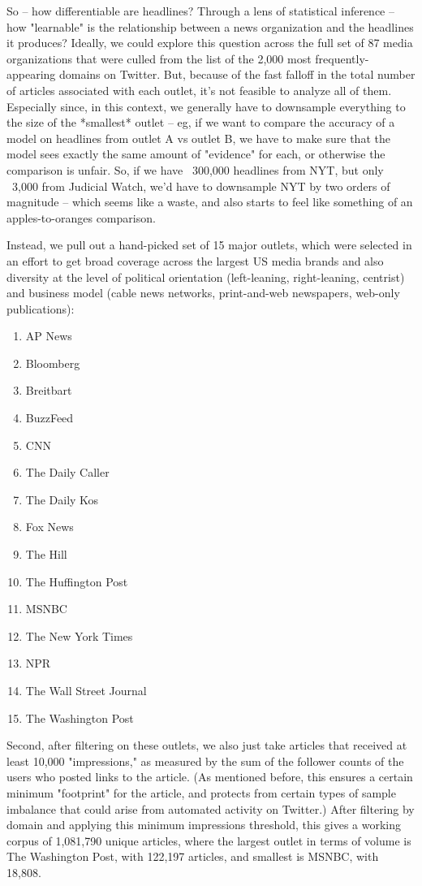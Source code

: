 \documentclass{scrartcl}
\begin{document}
So -- how differentiable are headlines? Through a lens of statistical inference -- how "learnable" is the relationship between a news organization and the headlines it produces? Ideally, we could explore this question across the full set of 87 media organizations that were culled from the list of the 2,000 most frequently-appearing domains on Twitter. But, because of the fast falloff in the total number of articles associated with each outlet, it's not feasible to analyze all of them. Especially since, in this context, we generally have to downsample everything to the size of the *smallest* outlet -- eg, if we want to compare the accuracy of a model on headlines from outlet A vs outlet B, we have to make sure that the model sees exactly the same amount of "evidence" for each, or otherwise the comparison is unfair. So, if we have ~300,000 headlines from NYT, but only ~3,000 from Judicial Watch, we'd have to downsample NYT by two orders of magnitude -- which seems like a waste, and also starts to feel like something of an apples-to-oranges comparison.

Instead, we pull out a hand-picked set of 15 major outlets, which were selected in an effort to get broad coverage across the largest US media brands and also diversity at the level of political orientation (left-leaning, right-leaning, centrist) and business model (cable news networks, print-and-web newspapers, web-only publications):

\begin{enumerate}
  \item AP News
  \item Bloomberg
  \item Breitbart
  \item BuzzFeed
  \item CNN
  \item The Daily Caller
  \item The Daily Kos
  \item Fox News
  \item The Hill
  \item The Huffington Post
  \item MSNBC
  \item The New York Times
  \item NPR
  \item The Wall Street Journal
  \item The Washington Post
\end{enumerate}

Second, after filtering on these outlets, we also just take articles that received at least 10,000 "impressions," as measured by the sum of the follower counts of the users who posted links to the article. (As mentioned before, this ensures a certain minimum "footprint" for the article, and protects from certain types of sample imbalance that could arise from automated activity on Twitter.) After filtering by domain and applying this minimum impressions threshold, this gives a working corpus of 1,081,790 unique articles, where the largest outlet in terms of volume is The Washington Post, with 122,197 articles, and smallest is MSNBC, with 18,808.
\end{document}
